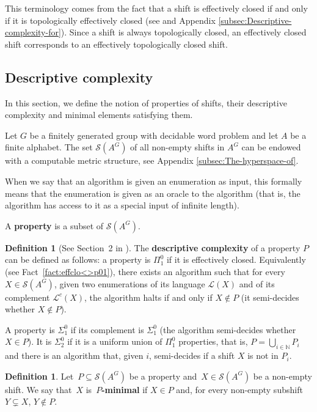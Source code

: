 \documentclass[french,american]{article}
\theoremstyle{plain}
\theoremstyle{definition}
\newtheorem{definition}[theorem]{Definition}
\theoremstyle{remark}
\theoremstyle{plain}
\newcommand{\N}{\mathbb{N}}
\begin{document}
This terminology comes from the fact that a shift is effectively closed if
and only if it is topologically effectively closed (see \cite{AUBRUN201735}
and Appendix \ref{subsec:Descriptive-complexity-for}). Since a shift
is always topologically closed, an effectively closed shift corresponds to
an effectively topologically closed shift.

\subsection{Descriptive complexity}

In this section, we define the notion of properties of shifts, their
descriptive complexity and minimal elements satisfying them.

Let $G$ be a finitely generated group with decidable word problem
and let $A$ be a finite alphabet. The set $\mathcal{S}(A^{G})$ of
all non-empty shifts in $A^{G}$ can be endowed with a computable
metric structure, see Appendix \ref{subsec:The-hyperspace-of}. 

When we say that an algorithm is given an enumeration as input, this formally means that the enumeration is given as an oracle to the algorithm (that is, the algorithm has access to it as a special input of infinite length).

A \textbf{property} is a subset of $\mathcal{S}(A^{G})$.
\begin{definition}[See Section~2 in \cite{cenzer99}]
\label{def:The-descriptive-complexity}The \textbf{descriptive complexity}
of a property $P$ can be defined as follows: a property is $\Pi_{1}^{0}$  if it is effectively closed. Equivalently (see Fact~\ref{fact:effclo<>p01}), there exists an algorithm such that for every $X\in\mathcal{S}(A^{G})$, given two enumerations of its language $\mathcal{L}(X)$ and of its complement $\mathcal{L}^{c}(X)$, the algorithm halts if and only if $X\notin P$ (it semi-decides whether $X\notin P$).

A property is $\Sigma_{1}^{0}$ if its complement is $\Sigma_{1}^{0}$
(the algorithm semi-decides whether $X\in P$). It is $\Sigma_{2}^{0}$
if it is a uniform union of $\Pi_{1}^{0}$ properties, that is, $P = \bigcup_{i\in\N}P_i$ and there is an algorithm that, given $i$, semi-decides if a shift $X$ is not in $P_i$.
\end{definition}

\begin{definition}
Let~$P\subseteq\mathcal{S}(A^{G})$ be a property and~$X\in\mathcal{S}(A^{G})$
be a non-empty shift. We say that~$X$ is~$P$\textbf{-minimal}
if $X\in P$ and, for every non-empty subshift $Y\subsetneq X$, $Y\notin P$.
\end{definition}
\end{document}
